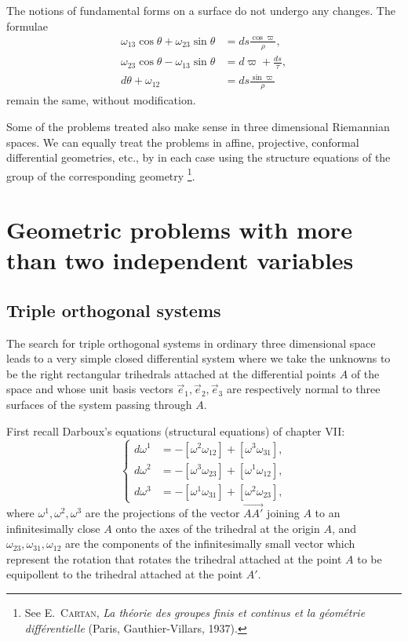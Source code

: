 \documentclass[leqno,11pt]{book}
\numberwithin{equation}{chapter}
\theoremstyle{shape1}
\theoremstyle{shape0}
\theoremstyle{shape2}
\theoremstyle{definition}
\begin{document}
The notions of fundamental forms on a surface do not undergo any changes. The formulae
\begin{align*}
  \omega_{13}\cos\theta+\omega_{23}\sin\theta&=ds\frac{\cos\varpi}{\rho},\\
  \omega_{23}\cos\theta-\omega_{13}\sin\theta&=d\varpi+\frac{ds}{\tau},\\
  d\theta+\omega_{12}&=ds\frac{\sin\varpi}{\rho}
\end{align*}
remain the same, without modification.

Some of the problems treated also make sense in three dimensional Riemannian spaces. We can equally treat the problems in affine, projective, conformal differential geometries, etc., by in each case using the structure equations of the group of the corresponding geometry \footnote{See \textsc{E.~Cartan}, \emph{La th\'eorie des groupes finis et continus et la g\'eom\'etrie diff\'erentielle} (Paris, Gauthier-Villars, 1937).}.

\chapter{Geometric problems with more than two independent variables}
\label{cha:geom-probl-with}

\section{Triple orthogonal systems}
\label{sec:orth-three-syst}

\fsec The search for triple orthogonal systems in ordinary three dimensional space leads to a very simple closed differential system where we take the unknowns to be the right rectangular trihedrals attached at the differential points $A$ of the space and whose unit basis vectors $\vec e_{1},\vec e_{2},\vec e_{3}$ are respectively normal to three surfaces  of the system passing through $A$.

First recall Darboux's equations (structural equations) of chapter VII:
\begin{equation}
  \label{eq:8.I.1}\tag{I, 1}
  \left\{
    \begin{aligned}
      d\omega^{1}&=-[\omega^{2}\omega_{12}]+[\omega^{3}\omega_{31}],\\
      d\omega^{2}&=-[\omega^{3}\omega_{23}]+[\omega^{1}\omega_{12}],\\
      d\omega^{3}&=-[\omega^{1}\omega_{31}]+[\omega^{2}\omega_{23}],
    \end{aligned}
  \right.
\end{equation}
where $\omega^{1},\omega^{2},\omega^{3}$ are the projections of the vector $\overrightarrow{AA'}$ joining $A$ to an infinitesimally close $A$ onto the axes of the trihedral at the origin $A$, and $\omega_{23},\omega_{31},\omega_{12}$ are the components of the infinitesimally small vector which represent the rotation that rotates the trihedral attached at the point $A$ to be equipollent to the trihedral attached at the point $A'$.
\end{document}
